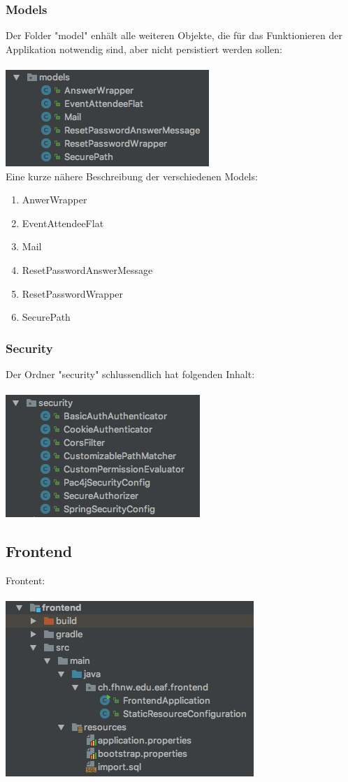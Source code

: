 \documentclass[11pt]{article} %
\begin{document}
\subsubsection{Models}
Der Folder "model" enhält alle weiteren Objekte, die für das Funktionieren der Applikation notwendig sind, aber nicht persistiert werden sollen:
\\
\\
\includegraphics[scale=0.7]{structure_eventmanagement_models}
\\
Eine kurze nähere Beschreibung der verschiedenen Models:
\begin{enumerate}
\item AnwerWrapper
\item EventAttendeeFlat
\item Mail
\item ResetPasswordAnswerMessage
\item ResetPasswordWrapper
\item SecurePath
\end{enumerate}
\subsubsection{Security}
Der Ordner "security" schlussendlich hat folgenden Inhalt:
\\
\\
\includegraphics[scale=0.7]{structure_eventmanagement_security}
\\
\subsection{Frontend}
Frontent:
\\
\\
\includegraphics[scale=0.7]{structure_frontend}
\\
\end{document}
